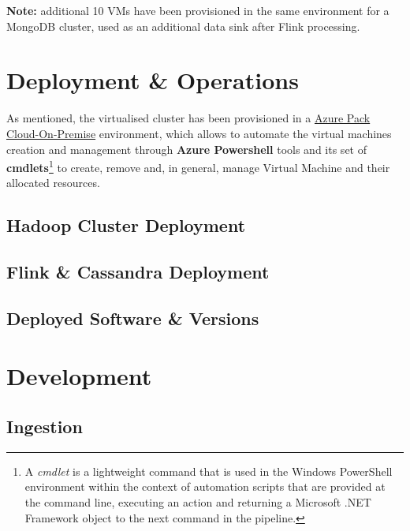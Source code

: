 \textbf{Note:} additional 10 VMs have been provisioned in the same environment for a MongoDB cluster, used as an additional data sink after Flink processing.

\section{Deployment \& Operations}

As mentioned, the virtualised cluster has been provisioned in a \href{https://www.microsoft.com/it-it/cloud-platform/windows-azure-pack}{Azure Pack Cloud-On-Premise} environment, which allows to automate the virtual machines creation and management through \textbf{Azure Powershell} tools and its set of \textbf{cmdlets}\footnote{A \textit{cmdlet} is a lightweight command that is used in the Windows PowerShell environment within the context of automation scripts that are provided at the command line, executing an action and returning a Microsoft .NET Framework object to the next command in the pipeline.} to create, remove and, in general, manage Virtual Machine and their allocated resources.

\subsection{Hadoop Cluster Deployment}



\subsection{Flink \& Cassandra Deployment}



\subsection{Deployed Software \& Versions}



\section{Development}

\subsection{Ingestion}



